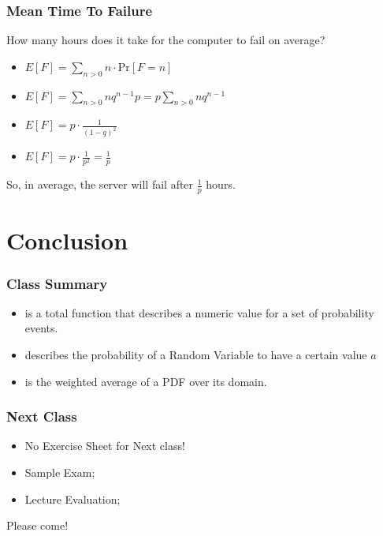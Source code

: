 \documentclass{beamer}
\begin{document}
\begin{frame}
  \frametitle{Mean Time To Failure}

  \alert{How many hours} does it take for the computer to fail on
  average?

  \bigskip
  
  \begin{itemize}
  \item $E[F] = \sum_{n>0}n\cdot\text{Pr}[F = n]$
    \bigskip
    
  \item $E[F] = \sum_{n>0}nq^{n-1}p = p\sum_{n>0}nq^{n-1}$
    \bigskip
    
  \item $E[F] = p\cdot\frac{1}{(1-q)^2}$
    \bigskip
    
  \item $E[F] = p\cdot\frac{1}{p^2} = \frac{1}{p}$
  \end{itemize}

  So, in average, the server will fail after $\frac{1}{p}$ hours.
\end{frame}


\section{Conclusion}

\begin{frame}
  \frametitle{Class Summary}
  \begin{itemize}
  \item {} is a total function that describes
    a numeric value for a set of probability events.
    \bigskip
    
  \item {} describes the
    probability of a Random Variable to have a certain value $a$
    \bigskip

  \item {} is the weighted average of a PDF over
    its domain.    
  \end{itemize}
\end{frame}

\begin{frame}
  \frametitle{Next Class}
  \begin{itemize}
  \item No Exercise Sheet for Next class!
    \bigskip
    
  \item Sample Exam;
    \bigskip

  \item Lecture Evaluation;
  \end{itemize}

  \vfill

  \begin{center}
    Please come!
  \end{center}
\end{frame}
\end{document}
